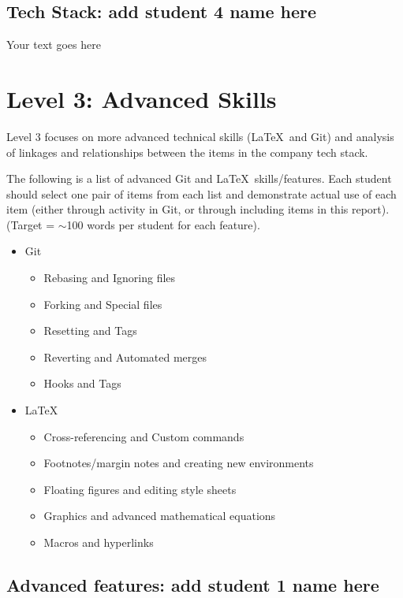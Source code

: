 \documentclass[a4paper, 11pt]{report}
\begin{document}
\subsection{Tech Stack: add student 4 name here}

Your text goes here



\newpage
\section{Level 3: Advanced Skills}

Level 3 focuses on more advanced technical skills (\LaTeX\ and Git) and analysis of linkages and relationships between the items in the company tech stack.

The following is a list of advanced Git and \LaTeX\ skills/features. Each student should select one pair of items from each list and demonstrate actual use of each item (either through activity in Git, or through including items in this report). (Target = $\sim$100 words per student for each feature).
\begin{itemize}
    \item Git
    \begin{itemize}
        \item Rebasing and Ignoring files
        \item Forking and Special files
        \item Resetting and Tags
        \item Reverting and Automated merges
        \item Hooks and Tags
    \end{itemize}
    \item \LaTeX\ 
    \begin{itemize}
        \item Cross-referencing and Custom commands
        \item Footnotes/margin notes and creating new environments
        \item Floating figures and editing style sheets
        \item Graphics and advanced mathematical equations
        \item Macros and hyperlinks
    \end{itemize}
\end{itemize}

\subsection{Advanced features: add student 1 name here}
\end{document}
